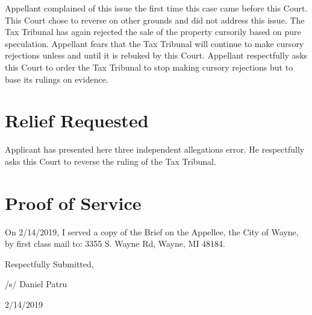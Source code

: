 \documentclass[12pt,\documentclassflag]{michiganCourtOfAppealsBrief}
\begin{document}
Appellant complained of this issue the first time this case came before this Court. This Court chose to reverse on other grounds and did not address this issue. The Tax Tribunal has again rejected the sale of the property cursorily based on pure speculation. Appellant fears that the Tax Tribunal will continue to make cursory rejections unless and until it is rebuked by this Court. Appellant respectfully asks this Court to order the Tax Tribunal to stop making cursory rejections but to base its rulings on evidence.

\section{Relief Requested}

Applicant has presented here three independent allegations error. He respectfully asks this Court to reverse the ruling of the Tax Tribunal. 

\section{Proof of Service}

On 2/14/2019, I served a copy of the Brief on the Appellee, the City of Wayne, by first class mail to: 3355 S. Wayne Rd, Wayne, MI 48184. 


\vspace{1\baselineskip}

{ \setlength{\leftskip}{3.5in}

  Respectfully Submitted,

  /s/ Daniel Patru

  2/14/2019

  \setlength{\leftskip}{0pt}}

\newpage\empty%
\end{document}

